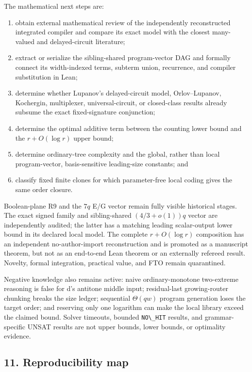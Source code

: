 \documentclass[
  11pt,
]{article}
\newcommand{\passthrough}[1]{#1}
\providecommand{\tightlist}{%
  \setlength{\itemsep}{0pt}\setlength{\parskip}{0pt}}
\theoremstyle{definition}
\theoremstyle{remark}
\begin{document}
The mathematical next steps are:

\begin{enumerate}
\def\labelenumi{\arabic{enumi}.}
\tightlist
\item
  obtain external mathematical review of the independently reconstructed
  integrated compiler and compare its exact model with the closest
  many-valued and delayed-circuit literature;
\item
  extract or serialize the sibling-shared program-vector DAG and
  formally connect its width-indexed terms, subterm union, recurrence,
  and compiler substitution in Lean;
\item
  determine whether Lupanov's delayed-circuit model, Orlov--Lupanov,
  Kochergin, multiplexer, universal-circuit, or closed-class results
  already subsume the exact fixed-signature conjunction;
\item
  determine the optimal additive term between the counting lower bound
  and the \(r+O(\log r)\) upper bound;
\item
  determine ordinary-tree complexity and the global, rather than local
  program-vector, basis-sensitive leading-size constants; and
\item
  classify fixed finite clones for which parameter-free local coding
  gives the same order closure.
\end{enumerate}

Boolean-plane R9 and the \(7q\) E/G vector remain fully visible
historical stages. The exact signed family and sibling-shared
\((4/3+o(1))q\) vector are independently audited; the latter has a
matching leading scalar-output lower bound in its declared local model.
The complete \(r+O(\log r)\) composition has an independent
no-author-import reconstruction and is promoted as a manuscript theorem,
but not as an end-to-end Lean theorem or an externally refereed result.
Novelty, formal integration, practical value, and FTO remain
quarantined.

Negative knowledge also remains active: naive ordinary-monotone
two-extreme reasoning is false for d's antitone middle input;
residual-last growing-router chunking breaks the size ledger; sequential
\(\Theta(qw)\) program generation loses the target order; and reserving
only one logarithm can make the local library exceed the claimed bound.
Solver timeouts, bounded \passthrough{\lstinline!NO\_HIT!} results, and
grammar-specific UNSAT results are not upper bounds, lower bounds, or
optimality evidence.

\hypertarget{reproducibility-map}{%
\subsection{11. Reproducibility map}\label{reproducibility-map}}
\end{document}
